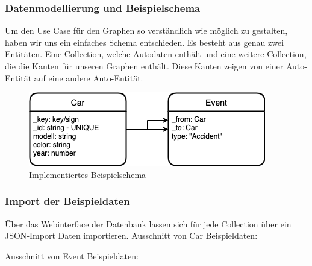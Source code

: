\subsubsection{Datenmodellierung und Beispielschema}
Um den Use Case für den Graphen so verständlich wie möglich zu gestalten, haben wir uns ein einfaches Schema entschieden. Es besteht aus genau zwei Entitäten. Eine Collection, welche Autodaten enthält und eine weitere Collection, die die Kanten für unseren Graphen enthält. Diese Kanten zeigen von einer Auto-Entität auf eine andere Auto-Entität.
\begin{figure}[htbp] 
  	\centering
     \includegraphics[width=.7\textwidth]{./images/8.Schema.png}
 	\caption{Implementiertes Beispielschema}
  \label{fig:DataSchema}
\end{figure}
\subsubsection{Import der Beispieldaten}
Über das Webinterface der Datenbank lassen sich für jede Collection über ein \ac{JSON}-Import Daten importieren.
Ausschnitt von Car Beispieldaten:

Ausschnitt von Event Beispieldaten:

